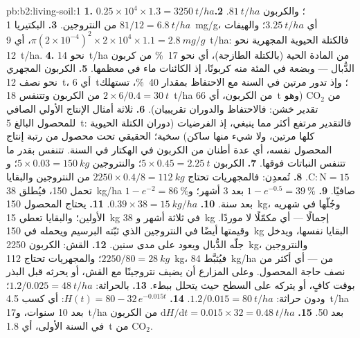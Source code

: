 \begin{solution}{pb:b2:living-soil:1}
\textbf{1.} $0.25\times 10^{4}\times 1.3 = \qty{3250}{t/ha}$؛
والكربون $\qty{81}{t/ha}$.
\textbf{2.} $81/12 = \qty{6.8}{t/ha}$ من النتروجين.
\textbf{3.} البكتيريا \qty{1}{mg/g}، أي $\qty{3.25}{t/ha}$؛ والهيفات
$\pi(2\times 10^{-4})^{2}\times 2\times 10^{4}\times 1.1 =
\qty{2.8}{mg/g}$، أي \qty{9}{t/ha}: فالكتلة الحيوية المجهرية نحو
\qty{12}{t/ha}.
\textbf{4.} نحو \qty{14}{t/ha} من المادة الحية (بالكتلة الطازجة)،
أي نحو \qty{17}{\%} من كربون الدُّبال --- وبضعة في المئة منه
كربونًا، إذ الكائنات ماء في معظمها.
\textbf{5.} الكربون المجهري نحو نصف \qty{12}{t}، أي \qty{6}{t}؛
وإذ تدور مرتين في السنة مع الاحتفاظ بمقدار \qty{40}{\%}، تستهلك
$2\times 6/0.4 = \qty{30}{t}$ من الكربون وتتنفس \qty{18}{t/ha}
من الكربون، أي \qty{66}{t} من $\mathrm{CO_2}$ (وهو تقدير خشن: فالاحتفاظ
والدوران تقريبيان).
\textbf{6.} ثلاثة أمثال الإنتاج الأولي الصافي للمحصول البالغ
\qty{5}{t}: فالتقدير مرتفع أكثر مما ينبغي، إذ الفرضيات (دوران الكتلة
الحيوية كلها مرتين، ولا شيء منها ساكن) سخية؛
 الحقيقي تحت محصول من رتبة إنتاج المحصول
نفسه، أي عدة أطنان من الكربون في الهكتار في السنة. 
تتنفس بقدر ما تتنفس النباتات فوقها.
\textbf{7.} الكربون $5\times 0.45 = \qty{2.25}{t}$؛ والنتروجين $5\times
0.03 = \qty{150}{kg}$؛ و$\mathrm{C:N} = 15$.
\textbf{8.} تُمعدِن: فالمجهريات تحتاج $2250\times 0.4/8 =
\qty{112}{kg}$ من النتروجين والبقايا تحمل 150، فيُطلق
\qty{38}{kg/ha} صافيًا.
\textbf{9.} $1 - e^{-0.5} = \qty{39}{\%}$ بعد 3 أشهر؛ و$1 - e^{-2}
= \qty{86}{\%}$ بعد سنة.
\textbf{10.} $0.39\times 38 = \qty{15}{kg/ha}$.
\textbf{11.} يحتاج المحصول \qty{150}{kg}، وجُلّها في شهريه
الأولين؛ والبقايا تعطي \qty{15}{kg} في ثلاثة أشهر و
\qty{38}{kg} إجمالًا --- أي مكمّلًا لا موردًا. وقيمتها
أيضًا في النتروجين الذي ثبّته البرسيم ويحمله في
\qty{150}{kg} البقايا نفسها، ويدخل جلّه الدُّبال ويعود
على مدى سنين.
\textbf{12.} القش: الكربون \qty{2250}{kg}، والنتروجين $2250/80 =
\qty{28}{kg}$؛ والمجهريات تحتاج \qty{112}{kg}، فيُثبَّط \qty{84}{kg/ha}
من  --- أي أكثر من نصف حاجة المحصول.
وعلى المزارع أن يضيف نتروجينًا مع القش، أو يحرثه قبل
البذر بوقت كافٍ، أو يتركه على السطح حيث يتحلل ببطء.
\textbf{13.} بالحراثة: $1.2/0.025 = \qty{48}{t/ha}$؛ ودون حراثة:
$1.2/0.015 = \qty{80}{t/ha}$.
\textbf{14.} $H(t) = 80 - 32\,e^{-0.015t}$: أي كسب \qty{4.5}{t/ha}
بعد 10 سنوات، و\qty{17}{t/ha} بعد 50.
\textbf{15.} $\mathrm{d}H/\mathrm{d}t = 0.015\times 32 =
\qty{0.48}{t/ha}$ من الكربون في السنة الأولى، أي \qty{1.8}{t} من
$\mathrm{CO_2}$.

\end{solution}
